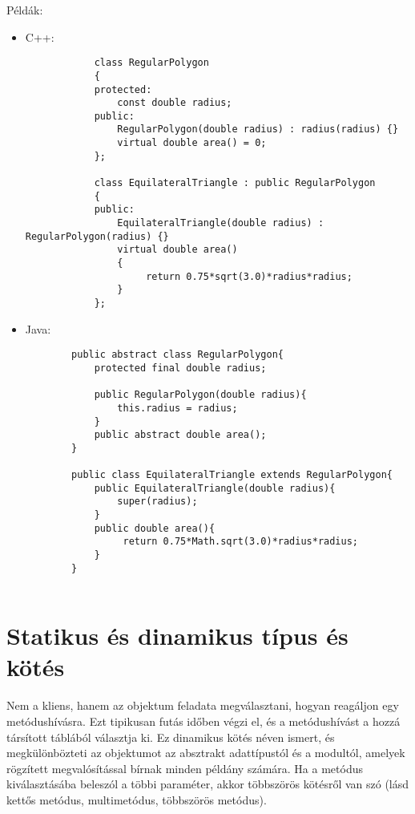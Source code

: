 \documentclass[margin=0px]{article}
\begin{document}
\noindent Példák:
\begin{itemize}
    \item	C++:
          \begin{verbatim}
            class RegularPolygon
            {
            protected:
                const double radius;
            public:
                RegularPolygon(double radius) : radius(radius) {}
                virtual double area() = 0;
            };
            
            class EquilateralTriangle : public RegularPolygon
            {
            public:
                EquilateralTriangle(double radius) : RegularPolygon(radius) {}
                virtual double area()
                {
                     return 0.75*sqrt(3.0)*radius*radius;
                }
            };
        \end{verbatim}

    \item	Java:
          \begin{verbatim}
        public abstract class RegularPolygon{
            protected final double radius;
        
            public RegularPolygon(double radius){
                this.radius = radius;
            }
            public abstract double area();
        }
        
        public class EquilateralTriangle extends RegularPolygon{
            public EquilateralTriangle(double radius){
                super(radius);
            }
            public double area(){
                 return 0.75*Math.sqrt(3.0)*radius*radius;
            }
        }
        
        \end{verbatim}
\end{itemize}

\section{Statikus és dinamikus típus és kötés}
Nem a kliens, hanem az objektum feladata megválasztani, hogyan reagáljon egy metódushívásra. Ezt tipikusan futás időben végzi el, és a metódushívást a hozzá társított táblából választja ki. Ez dinamikus kötés néven ismert, és megkülönbözteti az objektumot az absztrakt adattípustól és a modultól, amelyek rögzített megvalósítással bírnak minden példány számára. Ha a metódus kiválasztásába beleszól a többi paraméter, akkor többszörös kötésről van szó (lásd kettős metódus, multimetódus, többszörös metódus).
\end{document}
